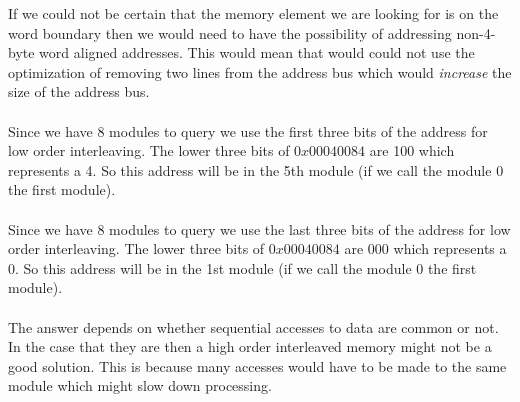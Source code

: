 \documentclass[11pt,reqno]{article}
\begin{document}
If we could not be certain that the memory element we are looking for is on the word boundary then we would need to have the possibility of addressing non-4-byte word aligned addresses. This would mean that would could not use the optimization of removing two lines from the address bus which would \emph{increase} the size of the address bus.\\

\noindent{}\\ 

Since we have 8 modules to query we use the first three bits of the address for low order interleaving. The lower three bits of $0x00040084$ are 100 which represents a 4. So this address will be in the 5th module (if we call the module 0 the first module).\\

\noindent{}\\ 

Since we have 8 modules to query we use the last three bits of the address for low order interleaving. The lower three bits of $0x00040084$ are 000 which represents a 0. So this address will be in the 1st module (if we call the module 0 the first module).\\

\noindent{}\\ 

The answer depends on whether sequential accesses to data are common or not. In the case that they are then a high order interleaved memory might not be a good solution. This is because many accesses would have to be made to the same module which might slow down processing.
\end{document}
